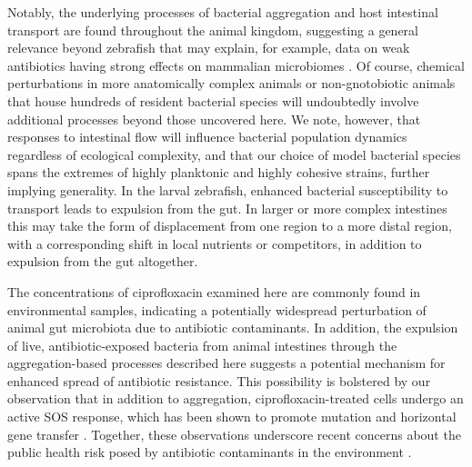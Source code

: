 Notably, the underlying processes of bacterial aggregation and host intestinal transport are found throughout the animal kingdom, suggesting a general relevance beyond zebrafish that may explain, for example, data on weak antibiotics having strong effects on mammalian microbiomes \cite{cho2012antibiotics,schulfer2019impact}. Of course, chemical perturbations in more anatomically complex animals or non-gnotobiotic animals that house hundreds of resident bacterial species will undoubtedly involve additional processes beyond those uncovered here. We note, however, that responses to intestinal flow will influence bacterial population dynamics regardless of ecological complexity, and that our choice of model bacterial species spans the extremes of highly planktonic and highly cohesive strains, further implying generality. In the larval zebrafish, enhanced bacterial susceptibility to transport leads to expulsion from the gut. In larger or more complex intestines this may take the form of displacement from one region to a more distal region, with a corresponding shift in local nutrients or competitors, in addition to expulsion from the gut altogether.

The concentrations of ciprofloxacin examined here are commonly found in environmental samples, indicating a potentially widespread perturbation of animal gut microbiota due to antibiotic contaminants. In addition, the expulsion of live, antibiotic-exposed bacteria from animal intestines through the aggregation-based processes described here suggests a potential mechanism for enhanced spread of antibiotic resistance. This possibility is bolstered by our observation that in addition to aggregation, ciprofloxacin-treated cells undergo an active SOS response, which has been shown to promote mutation and horizontal gene transfer \cite{baharoglu2011vibrio,guerin2009sos,beaber2004sos}. Together, these observations underscore recent concerns about the public health risk posed by antibiotic contaminants in the environment \cite{national2018environmental}.

